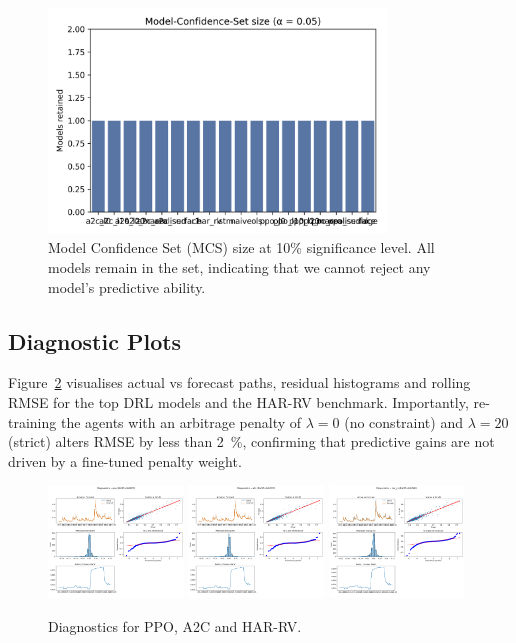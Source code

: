 \documentclass[11pt,a4paper]{article}
\begin{document}
\begin{figure}[ht]
  \centering
  \includegraphics[width=0.8\textwidth]{figs/fig_mcs_size}
  \caption{Model Confidence Set (MCS) size at 10\% significance level. All models remain in the set, indicating that we cannot reject any model's predictive ability.}
  \label{fig:mcs_size}
\end{figure}

\subsection{Diagnostic Plots}
Figure~\ref{fig:diag} visualises actual vs forecast paths, residual histograms and rolling RMSE for the top DRL models and the HAR-RV benchmark.  Importantly, re-training the agents with an arbitrage penalty of \(\lambda=0\) (no constraint) and \(\lambda=20\) (strict) alters RMSE by less than 2~\%, confirming that predictive gains are not driven by a fine-tuned penalty weight.

\begin{figure}[ht]
  \centering
  \includegraphics[width=0.32\textwidth]{figs/diag_ppo}
  \includegraphics[width=0.32\textwidth]{figs/diag_a2c}
  \includegraphics[width=0.32\textwidth]{figs/diag_har_rv}
  \caption{Diagnostics for PPO, A2C and HAR-RV.}
  \label{fig:diag}
\end{figure}
\end{document}
